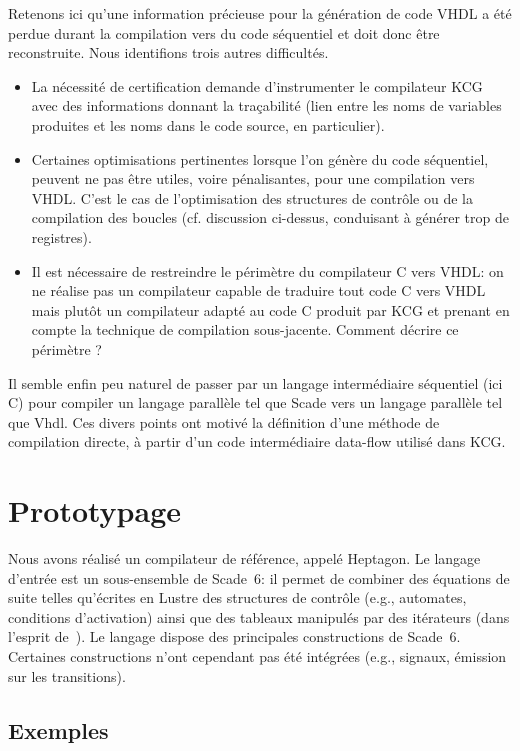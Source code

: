 \documentclass[a4paper]{article}
\newcommand{\LANG}{{\sc Heptagon}}
\newcommand{\lustre}{{\sc Lustre}}
\newcommand{\scade}{{\sc Scade}}
\newcommand{\scadesix}{{\sc Scade~6}}
\newcommand{\vhdl}{{\sc Vhdl}}
\begin{document}
Retenons ici qu'une information pr\'ecieuse pour la g\'en\'eration
de code VHDL a \'et\'e perdue durant la compilation vers du code s\'equentiel et
doit donc \^etre reconstruite. Nous identifions trois autres
difficult\'es.
\begin{itemize}
\item La n\'ecessit\'e de certification demande d'instrumenter le
  compilateur KCG avec des informations donnant la tra\c{c}abilit\'e (lien
  entre les noms de variables produites et les noms dans le code
  source, en particulier).
\item Certaines optimisations pertinentes lorsque l'on g\'en\`ere du code
  s\'equentiel, peuvent ne pas \^etre utiles, voire p\'enalisantes, pour une
  compilation vers VHDL. C'est le cas de l'optimisation des structures
  de contr\^ole ou de la compilation des boucles (cf. discussion
  ci-dessus, conduisant \`a g\'en\'erer trop de registres).
\item Il est n\'ecessaire de restreindre le p\'erim\`etre du compilateur C
  vers VHDL: on ne r\'ealise pas un compilateur capable de traduire tout
  code C vers VHDL mais plut\^ot un compilateur adapt\'e au code C produit
  par KCG et prenant en compte la technique de compilation
  sous-jacente. Comment d\'ecrire ce p\'erim\`etre ?
\end{itemize}

Il semble enfin peu naturel de passer par un langage
  interm\'ediaire s\'equentiel (ici C) pour compiler un langage parall\`ele
  tel que \scade{} vers un langage parall\`ele tel que \vhdl. Ces divers points
ont motiv\'e la d\'efinition d'une m\'ethode de compilation directe, \`a partir d'un
code interm\'ediaire data-flow utilis\'e dans KCG.

\section{Prototypage}
Nous avons r\'ealis\'e un compilateur de r\'ef\'erence, appel\'e \LANG{}. Le
langage d'entr\'ee est un sous-ensemble de \scadesix: il permet de
combiner des \'equations de suite telles qu'\'ecrites en \lustre{} des
structures de contr\^ole (e.g., automates, conditions d'activation)
ainsi que des tableaux manipul\'es par des it\'erateurs (dans l'esprit
de~\cite{lucy:genie00,morel-07-jes}). Le langage dispose des
principales constructions de \scadesix. Certaines constructions n'ont
cependant pas \'et\'e int\'egr\'ees (e.g., signaux, \'emission sur les
transitions).

\subsection{Exemples}
\end{document}
